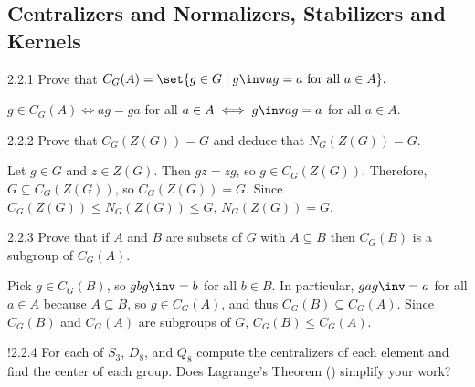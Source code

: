 \subsection{Centralizers and Normalizers, Stabilizers and Kernels}

\begin{exercise}{2.2.1}
    Prove that $C_G(A)=\set{g\in G\mid g\inv ag=a\text{ for all }a\in A}.$
\end{exercise}

\begin{sol}
    $g \in C_G(A) \iff ag = ga$ for all $a \in A \iff g\inv ag = a$ for all $a \in A$.
\end{sol}

\begin{exercise}{2.2.2}
    Prove that $C_G(Z(G))=G$ and deduce that $N_G(Z(G))=G.$
\end{exercise}

\begin{sol}
	Let $g \in G$ and $z \in Z(G)$.
	Then $gz = zg$, so $g \in C_G(Z(G))$.
    Therefore, $G \subseteq C_G(Z(G))$, so $C_G(Z(G)) = G$.
	Since $C_G(Z(G)) \leq N_G(Z(G)) \leq G$, $N_G(Z(G)) = G$.
\end{sol}

\begin{exercise}{2.2.3}
    Prove that if $A$ and $B$ are subsets of $G$ with $A \subseteq B$ then $C_G(B)$ is a subgroup of $C_G(A)$.
\end{exercise}

\begin{sol}
    Pick $g \in C_G(B)$, so $gbg\inv = b$ for all $b \in B$.
	In particular, $gag\inv = a$ for all $a \in A$ because $A \subseteq B$, so $g \in C_G(A)$, and thus $C_G(B) \subseteq C_G(A)$.
	Since $C_G(B)$ and $C_G(A)$ are subgroups of $G$, $C_G(B) \leq C_G(A)$.
\end{sol}

\begin{exercise}!{2.2.4}
    For each of $S_3$, $D_8$, and $Q_8$ compute the centralizers of each element and find the center of each group.
	Does Lagrange's Theorem () simplify your work?
\end{exercise}


